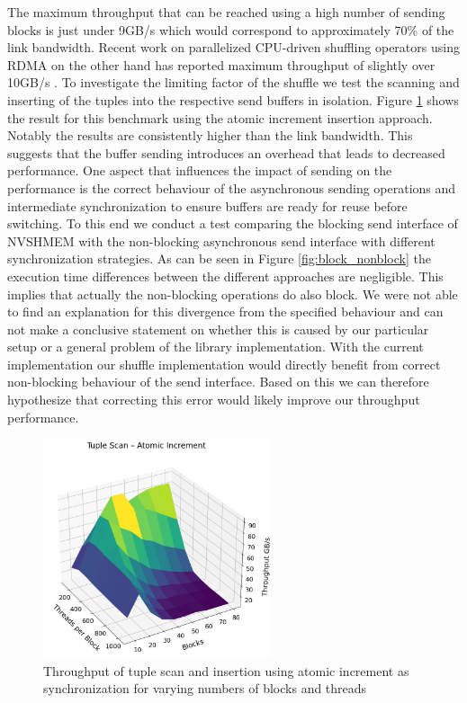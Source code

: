 The maximum throughput that can be reached using a high number of sending blocks is just under 9GB/s which would correspond to approximately 70\% of the link bandwidth. Recent work on parallelized CPU-driven shuffling operators using RDMA on the other hand has reported maximum throughput of slightly over 10GB/s \cite{liu2019}. To investigate the limiting factor of the shuffle we test the scanning and inserting of the tuples into the respective send buffers in isolation. Figure \ref{fig:atomic_insert} shows the result for this benchmark using the atomic increment insertion approach.  Notably the results are consistently higher than the link bandwidth. This suggests that the buffer sending introduces an overhead that leads to decreased performance. One aspect that influences the impact of sending on the performance is the correct behaviour of the asynchronous sending operations and intermediate synchronization to ensure buffers are ready for reuse before switching. To this end we conduct a test comparing the blocking send interface of NVSHMEM with the non-blocking asynchronous send interface with different synchronization strategies. As can be seen in Figure \ref{fig:block_nonblock} the execution time differences between the different approaches are negligible. This implies that actually the non-blocking operations do also block. We were not able to find an explanation for this divergence from the specified behaviour and can not make a conclusive statement on whether this is caused by our particular setup or a general problem of the library implementation. With the current implementation our shuffle implementation would directly benefit from correct non-blocking behaviour of the send interface. Based on this we can therefore hypothesize that correcting this error would likely improve our throughput performance.

\begin{figure}
    \centering
    \includegraphics[width=0.6\textwidth]{img/scan_speed_atomic.png}
    \caption{Throughput of tuple scan and insertion using atomic increment as synchronization for varying numbers of blocks and threads}
    \label{fig:atomic_insert}
\end{figure}

